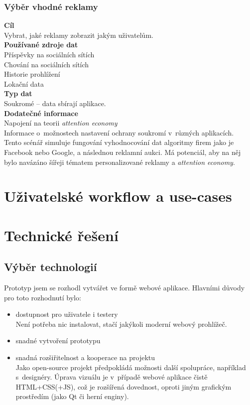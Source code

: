 \subsubsection*{Výběr vhodné reklamy} 
\textbf{Cíl}\\
Vybrat, jaké reklamy zobrazit jakým uživatelům.\\
\textbf{Používané zdroje dat}\\
Příspěvky na sociálních sítích\\
Chování na sociálních sítích\\
Historie prohlížení\\
Lokační data\\
\textbf{Typ dat}\\
Soukromé -- data sbírají aplikace.\\
\textbf{Dodatečné informace}\\
Napojení na teorii \textit{attention economy}\\
Informace o~možnostech nastavení ochrany soukromí v~různých aplikacích.\\

Tento scénář simuluje fungování vyhodnocování dat algoritmy firem jako je Facebook nebo Google, a následnou reklamní aukci. Má potenciál, aby na něj bylo navázáno šířeji tématem personalizované reklamy a \textit{attention economy}. 

\section{Uživatelské workflow a use-cases}

\section{Technické řešení}
\subsection{Výběr technologií}
Prototyp jsem se rozhodl vytvářet ve formě webové aplikace.
Hlavními důvody pro toto rozhodnutí bylo:
\begin{itemize}
	\item dostupnost pro uživatele i testery\\
	Není potřeba nic instalovat, stačí jakýkoli moderní webový prohlížeč.
	\item snadné vytvoření prototypu
	\item snadná rozšiřitelnost a kooperace na projektu\\ Jako open-source projekt předpokládá možnosti další spolupráce, například s~designéry. Úprava vizuálu je v~případě webové aplikace čistě HTML+CSS(+JS), což je rozšířená dovednost, oproti jiným grafickým prostředím (jako Qt či herní enginy).
\end{itemize}

